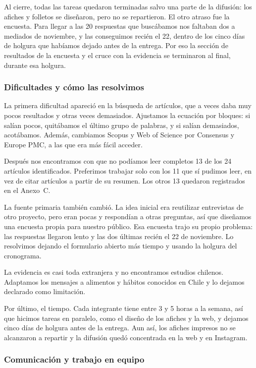 \documentclass[12pt, letterpaper, table, xcdraw]{extarticle}
\begin{document}
Al cierre, todas las tareas quedaron terminadas salvo una parte de la difusión: los afiches y folletos se diseñaron, pero no se repartieron. El otro atraso fue la encuesta. Para llegar a las 20 respuestas que buscábamos nos faltaban dos a mediados de noviembre, y las conseguimos recién el 22, dentro de los cinco días de holgura que habíamos dejado antes de la entrega. Por eso la sección de resultados de la encuesta y el cruce con la evidencia se terminaron al final, durante esa holgura.

\subsubsection{Dificultades y cómo las resolvimos}

La primera dificultad apareció en la búsqueda de artículos, que a veces daba muy pocos resultados y otras veces demasiados. Ajustamos la ecuación por bloques: si salían pocos, quitábamos el último grupo de palabras, y si salían demasiados, acotábamos. Además, cambiamos Scopus y Web of Science por Consensus y Europe PMC, a las que era más fácil acceder.

Después nos encontramos con que no podíamos leer completos 13 de los 24 artículos identificados. Preferimos trabajar solo con los 11 que sí pudimos leer, en vez de citar artículos a partir de su resumen. Los otros 13 quedaron registrados en el Anexo~C.

La fuente primaria también cambió. La idea inicial era reutilizar entrevistas de otro proyecto, pero eran pocas y respondían a otras preguntas, así que diseñamos una encuesta propia para nuestro público. Esa encuesta trajo su propio problema: las respuestas llegaron lento y las dos últimas recién el 22 de noviembre. Lo resolvimos dejando el formulario abierto más tiempo y usando la holgura del cronograma.

La evidencia es casi toda extranjera y no encontramos estudios chilenos. Adaptamos los mensajes a alimentos y hábitos conocidos en Chile y lo dejamos declarado como limitación.

Por último, el tiempo. Cada integrante tiene entre 3 y 5 horas a la semana, así que hicimos tareas en paralelo, como el diseño de los afiches y la web, y dejamos cinco días de holgura antes de la entrega. Aun así, los afiches impresos no se alcanzaron a repartir y la difusión quedó concentrada en la web y en Instagram.

\subsubsection{Comunicación y trabajo en equipo}
\end{document}
